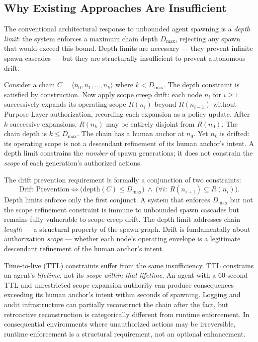 \subsection{Why Existing Approaches Are Insufficient}
\label{sec:rs-intro-existing}

The conventional architectural response to unbounded agent spawning is a \emph{depth limit}: the system enforces a maximum chain depth $D_{\max}$, rejecting any spawn that would exceed this bound. Depth limits are necessary — they prevent infinite spawn cascades — but they are structurally insufficient to prevent autonomous drift.

Consider a chain $C = \langle n_0, n_1, \ldots, n_k \rangle$ where $k < D_{\max}$. The depth constraint is satisfied by construction. Now apply scope creep drift: each node $n_i$ for $i \geq 1$ successively expands its operating scope $R(n_i)$ beyond $R(n_{i-1})$ without Purpose Layer authorization, recording each expansion as a policy update. After $k$ successive expansions, $R(n_k)$ may be entirely disjoint from $R(n_0)$. The chain depth is $k \leq D_{\max}$. The chain has a human anchor at $n_0$. Yet $n_k$ is drifted: its operating scope is not a descendant refinement of its human anchor's intent. A depth limit constrains the \emph{number} of spawn generations; it does not constrain the \emph{scope} of each generation's authorized actions.

The drift prevention requirement is formally a conjunction of two constraints:
\begin{equation}
\text{Drift Prevention} \iff \bigl( \text{depth}(C) \leq D_{\max} \bigr)\ \land\ \bigl( \forall i:\ R(n_{i+1}) \subseteq R(n_i) \bigr) .
\label{eq:intro-drift-prevention}
\end{equation}
Depth limits enforce only the first conjunct. A system that enforces $D_{\max}$ but not the scope refinement constraint is immune to unbounded spawn cascades but remains fully vulnerable to scope creep drift. The depth limit addresses chain \emph{length} — a structural property of the spawn graph. Drift is fundamentally about authorization \emph{scope} — whether each node's operating envelope is a legitimate descendant refinement of the human anchor's intent.

Time-to-live (TTL) constraints suffer from the same insufficiency. TTL constrains an agent's \emph{lifetime}, not its \emph{scope within that lifetime}. An agent with a 60-second TTL and unrestricted scope expansion authority can produce consequences exceeding its human anchor's intent within seconds of spawning. Logging and audit infrastructure can partially reconstruct the chain after the fact, but retroactive reconstruction is categorically different from runtime enforcement. In consequential environments where unauthorized actions may be irreversible, runtime enforcement is a structural requirement, not an optional enhancement.

